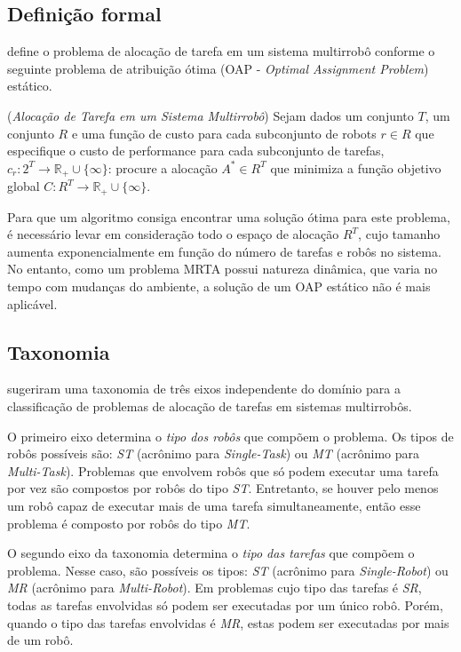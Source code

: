         \subsection{Definição formal} \label{subsec:mrta_formal}
             define o problema de alocação de tarefa em um sistema multirrobô conforme o seguinte problema de atribuição ótima (OAP - \textit{Optimal Assignment Problem}) estático.
            
            \begin{definicao} \label{def:mrta}
                (\textit{Alocação de Tarefa em um Sistema Multirrobô})
                Sejam dados um conjunto $T$, um conjunto $R$ e uma função de custo para cada subconjunto de robots $r \in R$ que especifique o custo de performance para cada subconjunto de tarefas, $c_r : 2^T \to \mathbb{R}_+\cup\{\infty\}$: procure a alocação $A^* \in R^T$ que minimiza a função objetivo global $C : R^T \to \mathbb{R}_+\cup\{\infty\}$.
            \end{definicao}
        
            Para que um algoritmo consiga encontrar uma solução ótima para este problema, é necessário levar em consideração todo o espaço de alocação $R^T$, cujo tamanho aumenta exponencialmente em função do número de tarefas e robôs no sistema. No entanto, como um problema MRTA possui natureza dinâmica, que varia no tempo com mudanças do ambiente, a solução de um OAP estático não é mais aplicável.
    
        \subsection{Taxonomia} \label{subsec:taxonomia_mrta}
             sugeriram uma taxonomia de três eixos independente do domínio para a classificação de problemas de alocação de tarefas em sistemas multirrobôs. 
            
            O primeiro eixo determina o \textit{tipo dos robôs} que compõem o problema. Os tipos de robôs possíveis são: \textit{ST} (acrônimo para \textit{Single-Task}) ou \textit{MT} (acrônimo para \textit{Multi-Task}). Problemas que envolvem robôs que só podem executar uma tarefa por vez são compostos por robôs do tipo \textit{ST}. Entretanto, se houver pelo menos um robô capaz de executar mais de uma tarefa simultaneamente, então esse problema é composto por robôs do tipo \textit{MT}. 
            
            O segundo eixo da taxonomia determina o \textit{tipo das tarefas} que compõem o problema. Nesse caso, são possíveis os tipos: \textit{ST} (acrônimo para \textit{Single-Robot}) ou \textit{MR} (acrônimo para \textit{Multi-Robot}). 
            Em problemas cujo tipo das tarefas é \textit{SR}, todas as tarefas envolvidas só podem ser executadas por um único robô. Porém, quando o tipo das tarefas envolvidas é \textit{MR}, estas podem ser executadas por mais de um robô.
            
